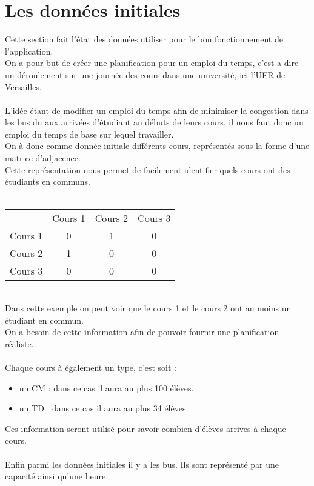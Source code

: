 \documentclass[a4paper,11pt]{article}
\begin{document}
\section{Les données initiales}
	Cette section fait l'état des données utiliser pour le bon fonctionnement de l'application.\\
	On a pour but de créer une planification pour un emploi du temps, c'est a dire un déroulement sur une journée des cours dans une université, ici l'UFR de Versailles.\\
	\\
	L'idée étant de modifier un emploi du temps afin de minimiser la congestion dans les bus du aux arrivées d'étudiant au débuts de leurs cours, il nous faut donc un emploi du temps de base sur lequel travailler.\\
	On à donc comme donnée initiale différents cours, représentés sous la forme d'une matrice d'adjacence. \\
	Cette représentation nous permet de facilement identifier quels cours ont des étudiants en communs.\\
	\\
	\begin{tabular}{ | c | c | c | c |}
		\hline			
		\       & Cours 1 & Cours 2 & Cours 3\\
		Cours 1 &   0     &    1    &     0  \\
		Cours 2 &   1     &    0    &     0  \\
		Cours 3 &   0     &    0    &     0  \\
		\hline  
	\end{tabular}\\
	Dans cette exemple on peut voir que le cours 1 et le cours 2 ont au moins un étudiant en commun.\\
	On a besoin de cette information afin de pouvoir fournir une planification réaliste.\\
	\\
	Chaque cours à également un type, c'est soit :
		\begin{itemize}
			\item un CM : dans ce cas il aura au plus 100 élèves.
			\item  un TD : dans ce cas il aura au plus 34 élèves.
		\end{itemize}
	Ces information seront utilisé pour savoir combien d'élèves arrives à chaque cours.\\
	\\
	Enfin parmi les données initiales il y a les bus. Ils sont représenté par une capacité ainsi qu'une heure. 
\end{document}
